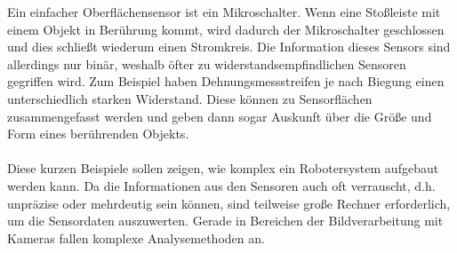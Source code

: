 Ein einfacher Oberflächensensor ist ein Mikroschalter. Wenn eine Stoßleiste mit einem Objekt in Berührung kommt, wird dadurch der Mikroschalter geschlossen und dies schließt wiederum einen Stromkreis. Die Information dieses Sensors sind allerdings nur binär, weshalb öfter zu widerstandsempfindlichen Sensoren gegriffen wird. Zum Beispiel haben Dehnungsmessstreifen je nach Biegung einen unterschiedlich starken Widerstand. Diese können zu Sensorflächen zusammengefasst werden und geben dann sogar Auskunft über die Größe und Form eines berührenden Objekts.
\\
\\
\noindent
Diese kurzen Beispiele sollen zeigen, wie komplex ein Robotersystem aufgebaut werden kann. Da die Informationen aus den Sensoren auch oft verrauscht, d.h. unpräzise oder mehrdeutig sein können, sind teilweise große Rechner erforderlich, um die Sensordaten auszuwerten. Gerade in Bereichen der Bildverarbeitung mit Kameras fallen komplexe Analysemethoden an.
